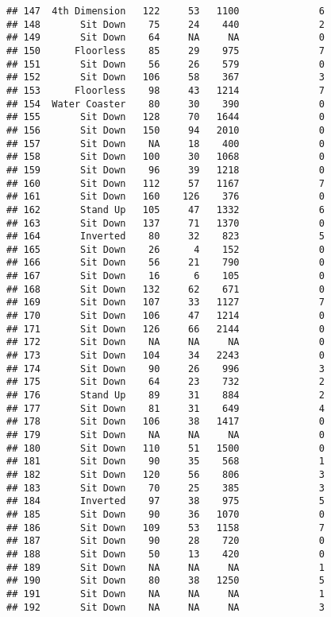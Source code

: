 \documentclass[
]{article}
\begin{document}
\begin{verbatim}
## 147  4th Dimension   122     53   1100              6
## 148       Sit Down    75     24    440              2
## 149       Sit Down    64     NA     NA              0
## 150      Floorless    85     29    975              7
## 151       Sit Down    56     26    579              0
## 152       Sit Down   106     58    367              3
## 153      Floorless    98     43   1214              7
## 154  Water Coaster    80     30    390              0
## 155       Sit Down   128     70   1644              0
## 156       Sit Down   150     94   2010              0
## 157       Sit Down    NA     18    400              0
## 158       Sit Down   100     30   1068              0
## 159       Sit Down    96     39   1218              0
## 160       Sit Down   112     57   1167              7
## 161       Sit Down   160    126    376              0
## 162       Stand Up   105     47   1332              6
## 163       Sit Down   137     71   1370              0
## 164       Inverted    80     32    823              5
## 165       Sit Down    26      4    152              0
## 166       Sit Down    56     21    790              0
## 167       Sit Down    16      6    105              0
## 168       Sit Down   132     62    671              0
## 169       Sit Down   107     33   1127              7
## 170       Sit Down   106     47   1214              0
## 171       Sit Down   126     66   2144              0
## 172       Sit Down    NA     NA     NA              0
## 173       Sit Down   104     34   2243              0
## 174       Sit Down    90     26    996              3
## 175       Sit Down    64     23    732              2
## 176       Stand Up    89     31    884              2
## 177       Sit Down    81     31    649              4
## 178       Sit Down   106     38   1417              0
## 179       Sit Down    NA     NA     NA              0
## 180       Sit Down   110     51   1500              0
## 181       Sit Down    90     35    568              1
## 182       Sit Down   120     56    806              3
## 183       Sit Down    70     25    385              3
## 184       Inverted    97     38    975              5
## 185       Sit Down    90     36   1070              0
## 186       Sit Down   109     53   1158              7
## 187       Sit Down    90     28    720              0
## 188       Sit Down    50     13    420              0
## 189       Sit Down    NA     NA     NA              1
## 190       Sit Down    80     38   1250              5
## 191       Sit Down    NA     NA     NA              1
## 192       Sit Down    NA     NA     NA              3

\end{verbatim}
\end{document}
